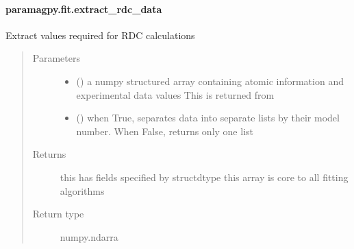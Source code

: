 \documentclass[a4paper,10pt,english,openany,oneside]{sphinxmanual}
\begin{document}
\paragraph{paramagpy.fit.extract\_rdc\_data}
\label{\detokenize{reference/generated/paramagpy.fit.extract_rdc_data:paramagpy-fit-extract-rdc-data}}\label{\detokenize{reference/generated/paramagpy.fit.extract_rdc_data::doc}}

\begin{fulllineitems}
\label{\detokenize{reference/generated/paramagpy.fit.extract_rdc_data:paramagpy.fit.extract_rdc_data}}
\sphinxAtStartPar
Extract values required for RDC calculations
\begin{quote}\begin{description}
\item[{Parameters}] \leavevmode\begin{itemize}
\item {} 
\sphinxAtStartPar
{} () \textendash{} a numpy structured array containing atomic information
and experimental data values
This is returned from
{\hyperref[\detokenize{reference/generated/paramagpy.protein.CustomStructure.parse:paramagpy.protein.CustomStructure.parse}]{}}

\item {} 
\sphinxAtStartPar
{} (\sphinxstyleliteralemphasis{\sphinxupquote{, }}) \textendash{} when True, separates data into separate lists
by their model number. When False, returns only one list

\end{itemize}

\item[{Returns}] \leavevmode
\sphinxAtStartPar
{} \textendash{} this has fields specified by structdtype
this array is core to all fitting algorithms

\item[{Return type}] \leavevmode
\sphinxAtStartPar
numpy.ndarra

\end{description}\end{quote}

\end{fulllineitems}
\end{document}
